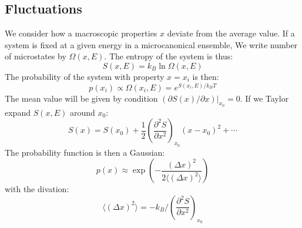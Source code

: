 \documentclass{article}
\begin{document}
\subsection*{Fluctuations}
We consider how a macroscopic properties $x$ deviate from the average
value. If a system is fixed at a given energy in a microcanonical ensemble, 
We write number of microstates by $\Omega(x,E)$. The entropy of the system
is thus:
\begin{equation}
    S(x,E) = k_B \ln \Omega(x,E)
\end{equation}
The probability of the system with property $x = x_i$ is then:
\begin{equation}
    p(x_i) \propto \Omega(x_i,E) = e^{S(x_i,E)/k_B T}
\end{equation}
The mean value will be given by condition $ (\partial S(x) /\partial x) |_{x_0} = 0$. If we 
Taylor expand $S(x,E)$ around $x_0$:
\begin{equation}
    S(x) = S(x_0) + \frac{1}{2}\left( \frac{\partial^2 S}{\partial x^2} \right)_{x_0} (x - x_0)^2 + \cdots
\end{equation}
The probability function is then a Gaussian:
\begin{equation}
    p(x) \approx \exp\left( - \frac{(\Delta x)^2}{2 \langle (\Delta x)^2 \rangle } \right)
\end{equation}
with the divation:
\begin{equation}
    \langle (\Delta x)^2 \rangle = - k_B / \left( \frac{\partial^2 S}{\partial x^2} \right)_{x_0}
\end{equation}

\end{document}
